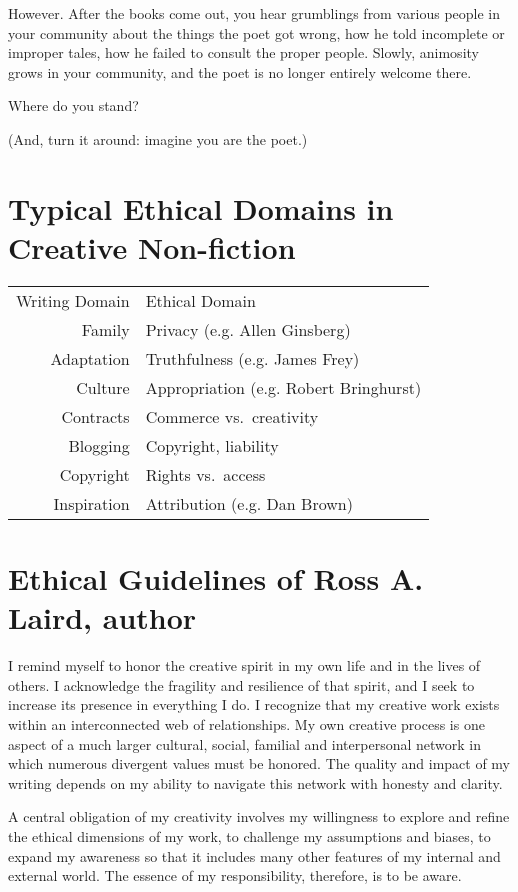 \documentclass[letterpaper,oneside]{memoir}
\begin{document}
\begin{description}
However. After the books come out, you hear grumblings from various people in your community about the things the poet got wrong, how he told incomplete or improper tales, how he failed to consult the proper people. Slowly, animosity grows in your community, and the poet is no longer entirely welcome there.

Where do you stand?

(And, turn it around: imagine you are the poet.)
\newpage
\section{Typical Ethical Domains in Creative Non-fiction}
\begin{center}
\begin{tabular}{rl}
Writing Domain   & Ethical Domain\\[12pt]
Family           & Privacy (e.g. Allen Ginsberg)\\
Adaptation       & Truthfulness (e.g. James Frey)\\
Culture          & Appropriation (e.g. Robert Bringhurst)\\
Contracts        & Commerce vs.\ creativity\\
Blogging         & Copyright, liability\\
Copyright        & Rights vs.\ access\\
Inspiration      & Attribution (e.g. Dan Brown)\\
\end{tabular}
\end{center}
\section{Ethical Guidelines of Ross A. Laird, author}
I remind myself to honor the creative spirit in my own life and in the lives of others. I acknowledge the fragility and resilience of that spirit, and I seek to increase its presence in everything I do. I recognize that my creative work exists within an interconnected web of relationships. My own creative process is one aspect of a much larger
cultural, social, familial and interpersonal network in which numerous divergent values must be honored. The quality and impact of my writing depends on my ability to navigate this network with honesty and clarity.

A central obligation of my creativity involves my willingness to explore and refine the ethical dimensions of my work, to challenge my assumptions and biases, to expand my awareness so that it includes many other features of my internal and external world. The essence of my responsibility, therefore, is to be aware.


\end{description}
\end{document}
